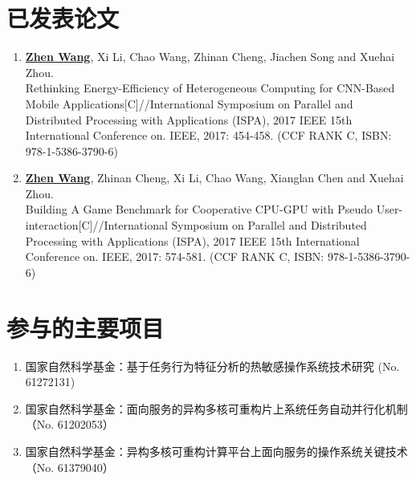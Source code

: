 \begin{publications}

\section*{已发表论文}

\begin{enumerate}
\item \textbf{\underline{Zhen Wang}}, Xi Li, Chao Wang, Zhinan Cheng, Jiachen Song and Xuehai Zhou.\\
Rethinking Energy-Efficiency of Heterogeneous Computing for CNN-Based Mobile Applications[C]//International Symposium on Parallel and Distributed Processing with Applications (ISPA), 2017 IEEE 15th International Conference on. IEEE, 2017: 454-458. (CCF RANK C, ISBN: 978-1-5386-3790-6)
\item \textbf{\underline{Zhen Wang}}, Zhinan Cheng, Xi Li, Chao Wang, Xianglan Chen and Xuehai Zhou.\\
Building A Game Benchmark for Cooperative CPU-GPU with Pseudo User-\\interaction[C]//International Symposium on Parallel and Distributed Processing with Applications (ISPA), 2017 IEEE 15th International Conference on. IEEE, 2017: 574-581. (CCF RANK C, ISBN: 978-1-5386-3790-6)
\end{enumerate}


\section*{参与的主要项目}
\begin{enumerate}
\item 国家自然科学基金：基于任务行为特征分析的热敏感操作系统技术研究 (No. 61272131)
\item 国家自然科学基金：面向服务的异构多核可重构片上系统任务自动并行化机制（No. 61202053）
\item 国家自然科学基金：异构多核可重构计算平台上面向服务的操作系统关键技术（No. 61379040）
\end{enumerate}

\end{publications}

